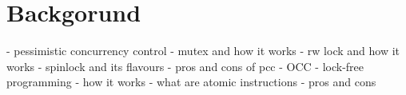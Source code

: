 \section{Backgorund}
\label{s:bg}

- pessimistic concurrency control
	- mutex and how it works
	- rw lock and how it works
	- spinlock and its flavours
	- pros and cons of pcc
- OCC
	- lock-free programming 
	- how it works 
	- what are atomic instructions
	- pros and cons

